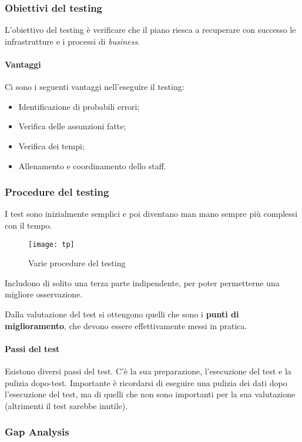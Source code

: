 \subsubsection{Obiettivi del testing}

L'obiettivo del testing è verificare che il piano riesca a recuperare con
successo le infrastrutture e i processi di \textit{business}.

\paragraph*{Vantaggi} Ci sono i seguenti vantaggi nell'eseguire il testing:
\begin{itemize}
  \item Identificazione di probabili errori;
  \item Verifica delle assunzioni fatte;
  \item Verifica dei tempi;
  \item Allenamento e coordinamento dello staff.
\end{itemize}

\subsubsection{Procedure del testing}

I test sono inizialmente semplici e poi diventano man mano sempre più complessi
con il tempo.

\begin{figure}[H]
 \centering
 \texttt{[image: tp]}
 \caption{Varie procedure del testing}
\end{figure}

Includono di solito una terza parte indipendente, per poter permetterne una
migliore osservazione.

Dalla valutazione del test si ottengono quelli che sono i \textbf{punti di
miglioramento}, che devono essere effettivamente messi in pratica.

\paragraph*{Passi del test} Esistono diversi passi del test. C'è la sua
preparazione, l'esecuzione del test e la pulizia dopo-test. Importante è
ricordarsi di eseguire una pulizia dei dati dopo l'esecuzione del test, ma di
quelli che non sono importanti per la sua valutazione (altrimenti il test
sarebbe inutile).

\subsubsection{Gap Analysis}

